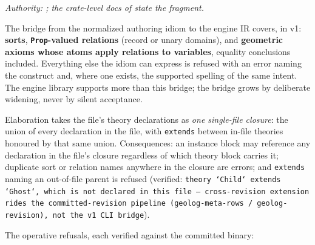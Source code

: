 \emph{Authority: ; the crate-level
docs of  state the fragment.}

The bridge from the normalized authoring idiom to the engine IR
covers, in v1: \textbf{sorts}, \textbf{\texttt{Prop}-valued
relations} (record or unary domains), and \textbf{geometric axioms
whose atoms apply relations to variables}, equality conclusions
included. Everything else the idiom can express is refused with an
error naming the construct and, where one exists, the supported
spelling of the same intent. The engine library supports more than
this bridge; the bridge grows by deliberate widening, never by silent
acceptance.

Elaboration takes the file's theory declarations as \emph{one
single-file closure}: the union of every declaration in the file,
with \texttt{extends} between in-file theories honoured by that same
union. Consequences: an instance block may reference any declaration
in the file's closure regardless of which theory block carries it;
duplicate sort or relation names anywhere in the closure are errors;
and \texttt{extends} naming an out-of-file parent is refused
(verified: \texttt{theory `Child` extends `Ghost`, which is not
declared in this file — cross-revision extension rides the
committed-revision pipeline (geolog-meta-rows / geolog-revision), not
the v1 CLI bridge}).

The operative refusals, each verified against the committed binary:

